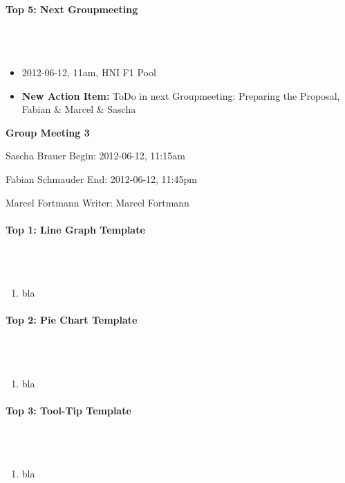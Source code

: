 \documentclass{scrartcl}
\begin{document}
\paragraph{Top 5: Next Groupmeeting}
\hfill \\ \hfill \\
\begin{itemize}
\item 2012-06-12, 11am, HNI F1 Pool
\item \textbf{New Action Item:} ToDo in next Groupmeeting: Preparing the Proposal, Fabian \& Marcel \& Sascha
\end {itemize}

\clearpage

\begin{center}
{\huge \textbf{Group Meeting 3}}\\
\end{center}
\begin{description}
\item Sascha Brauer \hfill Begin: 2012-06-12, 11:15am 
\item Fabian Schmauder \hfill End: 2012-06-12, 11:45pm
\item Marcel Fortmann \hfill Writer: Marcel Fortmann
\end{description}

\paragraph{Top 1: Line Graph Template}
\hfill \\ \hfill \\
\begin {enumerate}
\item bla
\end {enumerate}

\paragraph{Top 2: Pie Chart Template}
\hfill \\ \hfill \\
\begin {enumerate}
\item bla
\end {enumerate}

\paragraph{Top 3: Tool-Tip Template}
\hfill \\ \hfill \\
\begin {enumerate}
\item bla
\end {enumerate}
\end{document}
